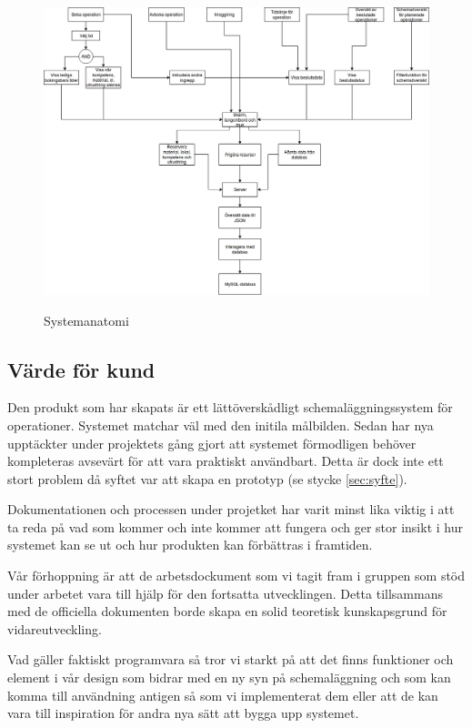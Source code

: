 \begin{figure}[H]
    \includegraphics[width=\textwidth,height=.4\textheight]{Figures/Systemanatomi.png}\\
    \caption{Systemanatomi}
    \label{fig:Systemanatomi}
\end{figure}

\subsection{Värde för kund}
Den produkt som har skapats är ett lättöverskådligt schemaläggningssystem för operationer. Systemet matchar väl med den initila målbilden. Sedan har nya upptäckter under projektets gång gjort att systemet förmodligen behöver kompleteras avsevärt för att vara praktiskt användbart. Detta är dock inte ett stort problem då syftet var att skapa en prototyp (se stycke \ref{sec:syfte}). 

Dokumentationen och processen under projetket har varit minst lika viktig i att ta reda på vad som kommer och inte kommer att fungera och ger stor insikt i hur systemet kan se ut och hur produkten kan förbättras i framtiden.

Vår förhoppning är att de arbetsdockument som vi tagit fram i gruppen som stöd under arbetet vara till hjälp för den fortsatta utvecklingen. Detta tillsammans med de officiella dokumenten borde skapa en solid teoretisk kunskapsgrund för vidareutveckling.

Vad gäller faktiskt programvara så tror vi starkt på att det finns funktioner och element i vår design som bidrar med en ny syn på schemaläggning och som kan komma till användning antigen så som vi implementerat dem eller att de kan vara till inspiration för andra nya sätt att bygga upp systemet.  

